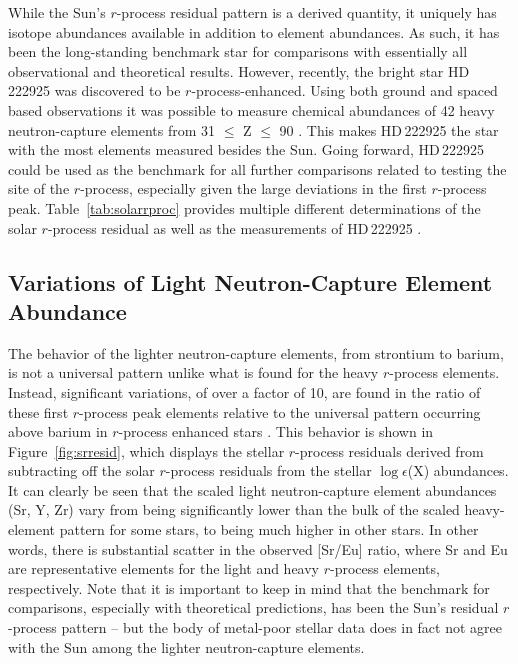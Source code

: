 \documentclass[letterpaper]{article}
\begin{document}
While the Sun's $r$-process residual pattern is a derived quantity, it uniquely has isotope abundances available in addition to element abundances. As such, it has been the long-standing benchmark star for comparisons with essentially all observational and theoretical results.  However, recently, the bright star HD\,222925 was discovered to be $r$-process-enhanced. Using both ground and spaced based observations it was possible to measure chemical abundances of 42 heavy neutron-capture elements from 31 $\le$ Z $\le$ 90 \citep{Roederer2022}. This makes HD\,222925 the star with the most elements measured besides the Sun. Going forward, HD\,222925 could be used as the benchmark for all further comparisons related to testing the site of the $r$-process, especially given the large deviations in the first $r$-process peak.
Table~\ref{tab:solarrproc} provides multiple different determinations of the solar $r$-process residual as well as the measurements of HD\,222925 \citep{Prantzos2020,Roederer2022}.




\subsection{Variations of Light Neutron-Capture Element Abundance}

The behavior of the lighter neutron-capture elements, from strontium to barium, is not a universal pattern unlike what is found for the heavy $r$-process elements. 
Instead, significant variations, of over a factor of 10, are found in the ratio of these first $r$-process peak elements relative to the universal pattern occurring above barium in $r$-process enhanced stars \citep[e.g.,][]{Sneden2008,Ji2016c,Ji2018}.
This behavior is shown in Figure~\ref{fig:srresid}, which displays the stellar $r$-process residuals derived from subtracting off the solar $r$-process residuals \citep{Burris00} from the stellar $\log \epsilon$(X) abundances. It can clearly be seen that the scaled light neutron-capture element abundances (Sr, Y, Zr) vary from being significantly lower than the bulk of the scaled heavy-element pattern for some stars, to being much higher in other stars. In other words, there is substantial scatter in the observed [Sr/Eu] ratio, where Sr and Eu are representative elements for the light and heavy $r$-process elements, respectively. 
Note that it is important to keep in mind that the benchmark for comparisons, especially with theoretical predictions, has been the Sun's residual $r$-process pattern -- but the body of metal-poor stellar data does in fact not agree with the Sun among the lighter neutron-capture elements. 
\end{document}
